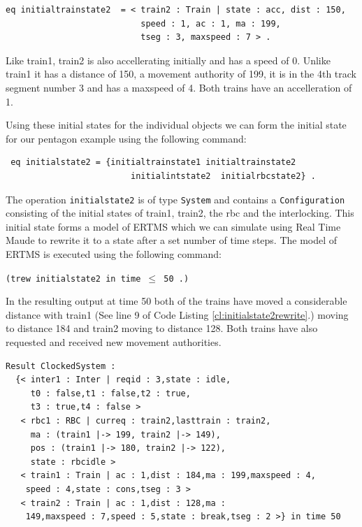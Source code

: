 \begin{lstlisting}[caption = The intial state of train2 in Maude]
eq initialtrainstate2  = < train2 : Train | state : acc, dist : 150, 
                           speed : 1, ac : 1, ma : 199,
                           tseg : 3, maxspeed : 7 > .
\end{lstlisting}
Like train1, train2 is also accellerating initially and has a speed of 0.  Unlike train1 it has a distance of 150, a movement authority of 199, it is in the 4th track segment number 3 and has a maxspeed of 4. Both trains have an accelleration of 1. 

Using these initial states for the individual objects we can form the initial state for our pentagon example using the following command:
\begin{lstlisting}
 eq initialstate2 = {initialtrainstate1 initialtrainstate2 
                         initialintstate2  initialrbcstate2} . 
\end{lstlisting}
The operation \texttt{initialstate2} is of type \texttt{System} and contains a \texttt{Configuration} consisting of the initial states of train1, train2, the rbc and the interlocking. This initial state forms a model of ERTMS which we can simulate using Real Time Maude to rewrite it to a state after a set number of time steps. The model of ERTMS is executed using the following command:
\begin{center}
\texttt{(trew initialstate2 in time $\leq$ 50 .)}
\end{center}

In the resulting output at time 50 both of the trains have moved a considerable distance with train1 (See line 9 of Code Listing \ref{cl:initialstate2rewrite}.) moving to distance 184 and train2 moving to distance 128. Both trains have also requested and received new movement authorities.
 
\begin{lstlisting}[caption = The result of rewriting initialstate2 for 50 time steps, label = cl:initialstate2rewrite]
Result ClockedSystem :
  {< inter1 : Inter | reqid : 3,state : idle,
     t0 : false,t1 : false,t2 : true,
     t3 : true,t4 : false > 
   < rbc1 : RBC | curreq : train2,lasttrain : train2,
     ma : (train1 |-> 199, train2 |-> 149),
     pos : (train1 |-> 180, train2 |-> 122),
     state : rbcidle > 
   < train1 : Train | ac : 1,dist : 184,ma : 199,maxspeed : 4,
    speed : 4,state : cons,tseg : 3 > 
   < train2 : Train | ac : 1,dist : 128,ma :
    149,maxspeed : 7,speed : 5,state : break,tseg : 2 >} in time 50
\end{lstlisting}

